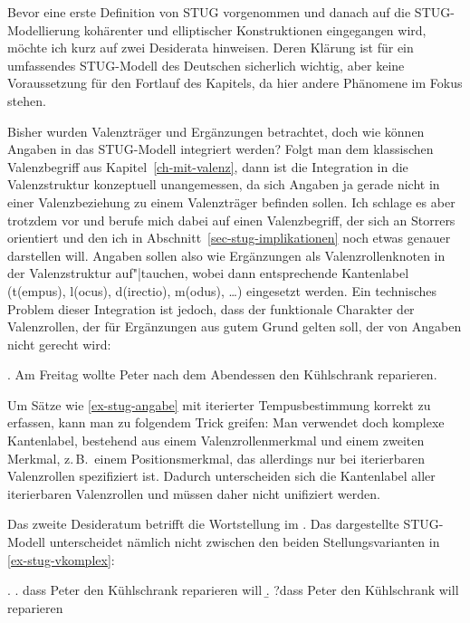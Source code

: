 Bevor eine erste Definition von STUG vorgenommen und danach auf die STUG-Modellierung kohärenter und elliptischer Konstruktionen eingegangen wird, möchte ich kurz auf zwei Desiderata hinweisen. Deren Klärung ist für ein umfassendes STUG-Modell des Deutschen sicherlich wichtig, aber keine Voraussetzung für den Fortlauf des Kapitels, da hier andere Phänomene im Fokus stehen.

Bisher wurden Valenzträger und Ergänzungen betrachtet, doch wie können Angaben in das STUG-Modell integriert werden? Folgt man dem klassischen Valenzbegriff aus Kapitel~\ref{ch-mit-valenz}, dann ist die Integration in die Valenzstruktur konzeptuell unangemessen, da sich Angaben ja gerade nicht in einer Valenzbeziehung zu einem Valenzträger befinden sollen. Ich schlage es aber trotzdem vor und berufe mich dabei auf einen Valenzbegriff, der sich an Storrers  orientiert und den ich in Abschnitt~\ref{sec-stug-implikationen} noch etwas genauer darstellen will. Angaben sollen also wie Ergänzungen als Valenzrollenknoten in der Valenzstruktur auf"|tauchen, wobei dann entsprechende Kantenlabel ({\sc t(empus)}, {\sc l(ocus)}, {\sc d(irectio)}, {\sc m(odus)}, \ldots) eingesetzt werden. Ein technisches Problem dieser Integration ist jedoch, dass der funktionale Charakter der Valenzrollen, der für Ergänzungen aus gutem Grund gelten soll, der  von Angaben nicht gerecht wird:

\ex. \label{ex-stug-angabe} Am Freitag wollte Peter nach dem Abendessen den Kühlschrank reparieren.

Um Sätze wie \ref{ex-stug-angabe} mit iterierter Tempusbestimmung korrekt zu erfassen, kann man zu folgendem Trick greifen: Man verwendet doch komplexe Kantenlabel, bestehend aus einem Valenzrollenmerkmal und einem zweiten  Merkmal, z.\,B.\ einem Positionsmerkmal, das allerdings nur bei iterierbaren Valenzrollen spezifiziert ist. Dadurch unterscheiden sich die Kantenlabel aller iterierbaren Valenzrollen und müssen daher nicht unifiziert werden.      

Das zweite Desideratum betrifft die Wortstellung im . Das dargestellte STUG-Modell unterscheidet nämlich nicht zwischen den beiden Stellungsvarianten in \ref{ex-stug-vkomplex}:

\ex. \label{ex-stug-vkomplex}
\a. dass Peter den Kühlschrank reparieren will 
\b. ?dass Peter den Kühlschrank will reparieren\label{ex-stug-vkomplex-b} 

